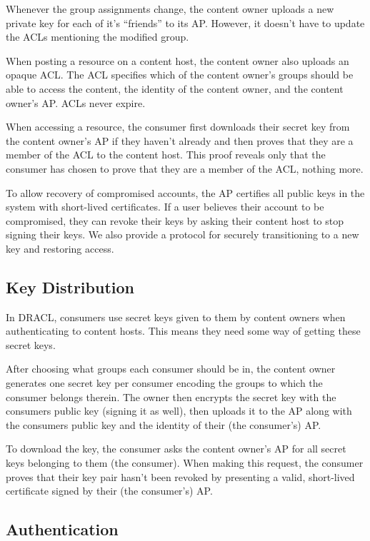 \documentclass[pdftex,12pt,a4papaer]{report}
\begin{document}
Whenever the group assignments change, the content owner uploads a new private
key for each of it's ``friends'' to its AP. However, it doesn't have to update
the ACLs mentioning the modified group.
  
When posting a resource on a content host, the content owner also uploads an
opaque ACL. The ACL specifies which of the content owner's groups should be able
to access the content, the identity of the content owner, and the content
owner's AP. ACLs never expire.
  
When accessing a resource, the consumer first downloads their secret key from
the content owner's AP if they haven't already and then proves that they are a
member of the ACL to the content host. This proof reveals only that the consumer
has chosen to prove that they are a member of the ACL, nothing more.
  
To allow recovery of compromised accounts, the AP certifies all public keys in
the system with short-lived certificates. If a user believes their account to be
compromised, they can revoke their keys by asking their content host to stop
signing their keys. We also provide a protocol for securely transitioning to a
new key and restoring access.

\subsection{Key Distribution}

In DRACL, consumers use secret keys given to them by content owners when
authenticating to content hosts. This means they need some way of getting these
secret keys.

After choosing what groups each consumer should be in, the content owner
generates one secret key per consumer encoding the groups to which the consumer
belongs therein. The owner then encrypts the secret key with the consumers
public key (signing it as well), then uploads it to the AP along with the
consumers public key and the identity of their (the consumer's) AP.

To download the key, the consumer asks the content owner's AP for all secret
keys belonging to them (the consumer). When making this request, the consumer
proves that their key pair hasn't been revoked by presenting a valid,
short-lived certificate signed by their (the consumer's) AP.

\subsection{Authentication}
\label{sub:authentication}
\end{document}
